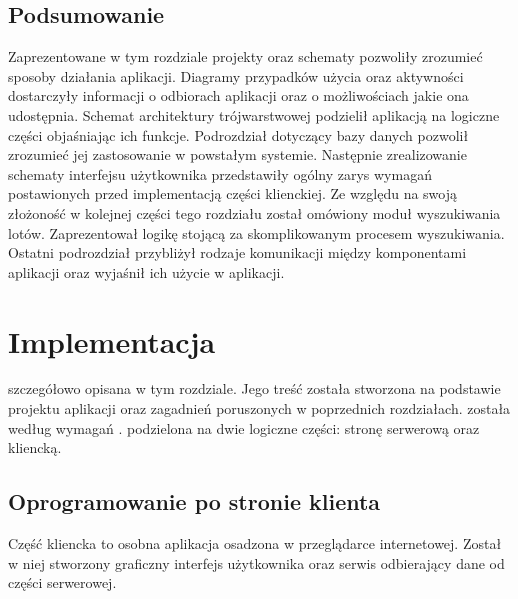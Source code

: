\documentclass[12pt, twoside]{report}
\begin{document}
\section{Podsumowanie}
Zaprezentowane w tym rozdziale projekty oraz schematy pozwoliły zrozumieć sposoby działania aplikacji. Diagramy przypadków użycia oraz aktywności dostarczyły informacji o odbiorach aplikacji oraz o możliwościach jakie ona udostępnia. Schemat architektury trójwarstwowej podzielił aplikacją na logiczne części objaśniając ich funkcje. Podrozdział dotyczący bazy danych pozwolił zrozumieć jej zastosowanie w powstałym systemie. Następnie zrealizowanie schematy interfejsu użytkownika przedstawiły ogólny zarys wymagań postawionych przed implementacją części klienckiej. Ze względu na swoją złożoność w kolejnej części tego rozdziału został omówiony moduł wyszukiwania lotów. Zaprezentował logikę stojącą za skomplikowanym procesem wyszukiwania. Ostatni podrozdział przybliżył rodzaje komunikacji między komponentami aplikacji oraz wyjaśnił ich użycie w aplikacji.



\chapter{Implementacja}
  szczegółowo opisana w tym rozdziale. Jego treść została stworzona na podstawie projektu aplikacji oraz zagadnień poruszonych w poprzednich rozdziałach.  została  według  wymagań .  podzielona na dwie logiczne części: stronę serwerową oraz kliencką.  

\section{Oprogramowanie po stronie klienta}
Część kliencka to osobna aplikacja osadzona w przeglądarce internetowej. Został w niej stworzony graficzny interfejs użytkownika oraz serwis odbierający dane od części serwerowej.
\end{document}
